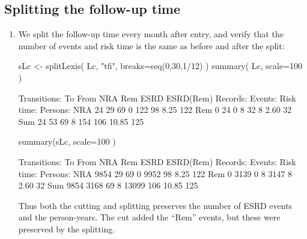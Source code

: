 \subsection{Splitting the follow-up time}


\begin{enumerate}[resume]


\item We split the follow-up time every month after entry, and verify
  that the number of events and risk time is the same as before and
  after the split:
\begin{Schunk}
\begin{Sinput}
 sLc <- splitLexis( Lc, "tfi", breaks=seq(0,30,1/12) )
 summary( Lc, scale=100 )
\end{Sinput}
\begin{Soutput}
Transitions:
     To
From  NRA Rem ESRD ESRD(Rem)  Records:  Events: Risk time:  Persons:
  NRA  24  29   69         0       122       98       8.25       122
  Rem   0  24    0         8        32        8       2.60        32
  Sum  24  53   69         8       154      106      10.85       125
\end{Soutput}
\begin{Sinput}
 summary(sLc, scale=100 )
\end{Sinput}
\begin{Soutput}
Transitions:
     To
From   NRA  Rem ESRD ESRD(Rem)  Records:  Events: Risk time:  Persons:
  NRA 9854   29   69         0      9952       98       8.25       122
  Rem    0 3139    0         8      3147        8       2.60        32
  Sum 9854 3168   69         8     13099      106      10.85       125
\end{Soutput}
\end{Schunk}
  Thus both the cutting and splitting preserves the number of ESRD
  events and the person-years. The cut added the ``Rem'' events, but
  these were preserved by the splitting.


\end{enumerate}
